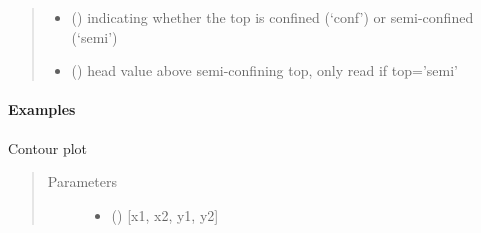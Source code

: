 \documentclass[letterpaper,10pt,english]{sphinxmanual}
\begin{document}
\begin{fulllineitems}
\begin{quote}
\begin{description}
\begin{itemize}
\item {} 
 (\sphinxstyleliteralemphasis{, }\sphinxstyleliteralemphasis{ (}\sphinxstyleliteralemphasis{)}) \textendash{} indicating whether the top is confined (‘conf’) or
semi-confined (‘semi’)

\item {} 
 (\sphinxstyleliteralemphasis{ (}\sphinxstyleliteralemphasis{)}) \textendash{} head value above semi-confining top, only read if top=’semi’

\end{itemize}

\end{description}\end{quote}
\paragraph{Examples}

\begin{sphinxVerbatim}[commandchars=\\\{\}]
  \PYG{p}{[} \PYG{p}{]} \PYG{p}{[}   \PYG{p}{]} 
\end{sphinxVerbatim}

\begin{fulllineitems}
\label{\detokenize{models/modelmaq:timml.model.ModelMaq.contour}}
Contour plot
\begin{quote}\begin{description}
\item[{Parameters}] \leavevmode\begin{itemize}
\item {} 
 () \textendash{} {[}x1, x2, y1, y2{]}


\end{itemize}
\end{description}
\end{quote}
\end{fulllineitems}
\end{fulllineitems}
\end{document}

